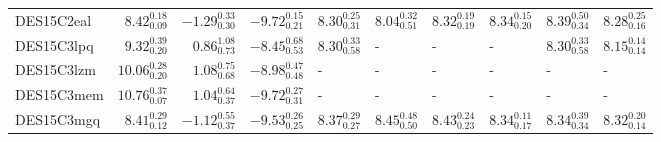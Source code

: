 \documentclass[fleqn,usenatbib,]{mnras}
\begin{document}
\begin{table}
\begin{threeparttable}
\begin{tabular}{lrrrllllll}
DES15C2eal  &   $8.42 _{\scriptscriptstyle 0.09} ^{\scriptscriptstyle 0.18}$ &  $-1.29 _{\scriptscriptstyle 0.30} ^{\scriptscriptstyle 0.33}$ &   $-9.72 _{\scriptscriptstyle 0.21} ^{\scriptscriptstyle 0.15}$ &  $8.30 _{\scriptscriptstyle 0.31} ^{\scriptscriptstyle 0.25}$ &  $8.04 _{\scriptscriptstyle 0.51} ^{\scriptscriptstyle 0.32}$ &  $8.32 _{\scriptscriptstyle 0.19} ^{\scriptscriptstyle 0.19}$ &  $8.34 _{\scriptscriptstyle 0.20} ^{\scriptscriptstyle 0.15}$ &  $8.39 _{\scriptscriptstyle 0.34} ^{\scriptscriptstyle 0.50}$ &  $8.28 _{\scriptscriptstyle 0.16} ^{\scriptscriptstyle 0.25}$ \\
DES15C3lpq  &   $9.32 _{\scriptscriptstyle 0.20} ^{\scriptscriptstyle 0.39}$ &   $0.86 _{\scriptscriptstyle 0.73} ^{\scriptscriptstyle 1.08}$ &   $-8.45 _{\scriptscriptstyle 0.53} ^{\scriptscriptstyle 0.68}$ &  $8.30 _{\scriptscriptstyle 0.58} ^{\scriptscriptstyle 0.33}$ &                                                             - &                                                             - &                                                             - &  $8.30 _{\scriptscriptstyle 0.58} ^{\scriptscriptstyle 0.33}$ &  $8.15 _{\scriptscriptstyle 0.14} ^{\scriptscriptstyle 0.14}$ \\
DES15C3lzm  &  $10.06 _{\scriptscriptstyle 0.20} ^{\scriptscriptstyle 0.28}$ &   $1.08 _{\scriptscriptstyle 0.68} ^{\scriptscriptstyle 0.75}$ &   $-8.98 _{\scriptscriptstyle 0.48} ^{\scriptscriptstyle 0.47}$ &                                                             - &                                                             - &                                                             - &                                                             - &                                                             - &                                                             - \\
DES15C3mem  &  $10.76 _{\scriptscriptstyle 0.07} ^{\scriptscriptstyle 0.37}$ &   $1.04 _{\scriptscriptstyle 0.37} ^{\scriptscriptstyle 0.64}$ &   $-9.72 _{\scriptscriptstyle 0.31} ^{\scriptscriptstyle 0.27}$ &                                                             - &                                                             - &                                                             - &                                                             - &                                                             - &                                                             - \\
DES15C3mgq  &   $8.41 _{\scriptscriptstyle 0.12} ^{\scriptscriptstyle 0.29}$ &  $-1.12 _{\scriptscriptstyle 0.37} ^{\scriptscriptstyle 0.55}$ &   $-9.53 _{\scriptscriptstyle 0.25} ^{\scriptscriptstyle 0.26}$ &  $8.37 _{\scriptscriptstyle 0.27} ^{\scriptscriptstyle 0.29}$ &  $8.45 _{\scriptscriptstyle 0.50} ^{\scriptscriptstyle 0.48}$ &  $8.43 _{\scriptscriptstyle 0.23} ^{\scriptscriptstyle 0.24}$ &  $8.34 _{\scriptscriptstyle 0.17} ^{\scriptscriptstyle 0.11}$ &  $8.34 _{\scriptscriptstyle 0.34} ^{\scriptscriptstyle 0.39}$ &  $8.32 _{\scriptscriptstyle 0.14} ^{\scriptscriptstyle 0.20}$ \\

\end{tabular}
\end{threeparttable}
\end{table}
\end{document}
